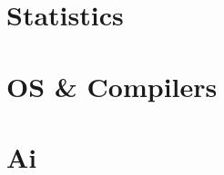 \section{Statistics}
\hypertarget{cat:stat}{}


\section{OS \& Compilers}
\hypertarget{cat:os}{}



\section{Ai}
\hypertarget{cat:ai}{}



